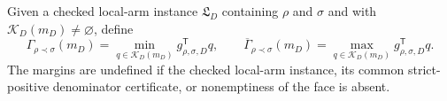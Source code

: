Given a checked local-arm instance \(\mathfrak L_D\) containing \(\rho\) and \(\sigma\) and with \(\mathcal K_D(m_D)\ne\varnothing\), define
\[
\Gamma_{\rho\prec\sigma}(m_D)=\min_{q\in\mathcal K_D(m_D)}g_{\rho,\sigma,D}^{\mathsf T}q,\qquad
\overline\Gamma_{\rho\prec\sigma}(m_D)=\max_{q\in\mathcal K_D(m_D)}g_{\rho,\sigma,D}^{\mathsf T}q.
\]
The margins are undefined if the checked local-arm instance, its common strict-positive denominator certificate, or nonemptiness of the face is absent.